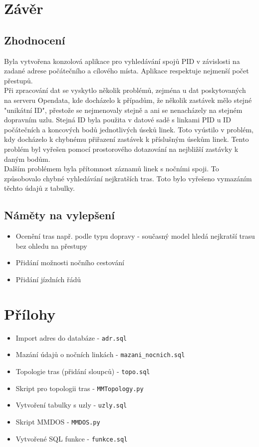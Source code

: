 \documentclass[a4paper, 12pt]{article}
\begin{document}
\newpage
\section{Závěr}
\subsection{Zhodnocení}
Byla vytvořena konzolová aplikace pro vyhledávání spojů PID v závislosti na zadané adrese počátečního a cílového místa. Aplikace respektuje nejmenší počet přestupů. \\
Při zpracování dat se vyskytlo několik problémů, zejména u dat poskytovaných na serveru Opendata, kde docházelo k případům, že několik zastávek mělo stejné "unikátní ID", přestože se nejmenovaly stejně a ani se nenacházely na stejném dopravním uzlu. Stejná ID byla použita v datové sadě s linkami PID u ID počátečních a koncových bodů jednotlivých úseků linek. Toto vyústilo v problém, kdy docházelo k chybnému přiřazení zastávek k příslušným úsekům linek. Tento problém byl vyřešen pomocí prostorového dotazování na nejbližší zastávky k daným bodům. \\
Dalším problémem byla přítomnost záznamů linek s nočními spoji. To způsobovalo chybné vyhledávání nejkratších tras. Toto bylo vyřešeno vymazáním těchto údajů z tabulky. \\

\subsection{Náměty na vylepšení}
\begin{itemize}
	\item Ocenění tras např. podle typu dopravy - současný model hledá nejkratší trasu bez ohledu na přestupy
	\item Přidání možnosti nočního cestování
	\item Přidání jízdních řádů
\end{itemize}

\newpage
\section{Přílohy}
\begin{itemize}
	\item Import adres do databáze - \texttt{adr.sql}
	\item Mazání údajů o nočních linkách - \texttt{mazani\_nocnich.sql}
	\item Topologie tras (přidání sloupců) - \texttt{topo.sql}
	\item Skript pro topologii tras - \texttt{MMTopology.py}
	\item Vytvoření tabulky s uzly - \texttt{uzly.sql}
	\item Skript MMDOS - \texttt{MMDOS.py}
	\item Vytvořené SQL funkce - \texttt{funkce.sql}
\end{itemize}
\end{document}
